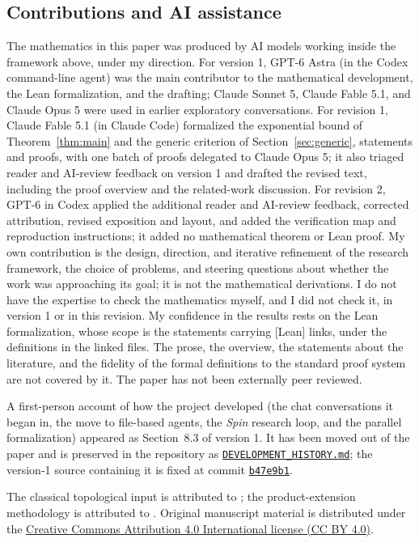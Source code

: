 \subsection{Contributions and AI assistance}\label{sec:model-assistance}
The mathematics in this paper was produced by AI models working inside the
framework above, under my direction. For version 1, GPT-6 Astra (in the
Codex command-line agent) was the main contributor to the mathematical
development, the Lean formalization, and the drafting; Claude Sonnet 5,
Claude Fable 5.1, and Claude Opus 5 were used in earlier exploratory
conversations. For revision 1, Claude Fable 5.1 (in Claude Code) formalized
the exponential bound of Theorem~\ref{thm:main} and the generic criterion of
Section~\ref{sec:generic}, statements and proofs, with one batch of proofs
delegated to Claude Opus 5; it also triaged reader and AI-review feedback on
version 1 and drafted the revised text, including the proof overview and
the related-work discussion. For revision 2, GPT-6 in Codex applied the
additional reader and AI-review feedback, corrected attribution, revised
exposition and layout, and added the verification map and reproduction
instructions; it added no mathematical theorem or Lean proof. My own contribution is the design, direction,
and iterative refinement of the research framework, the choice of problems,
and steering questions about whether the work was approaching its goal; it
is not the mathematical derivations. I do not have the expertise to check
the mathematics myself, and I did not check it, in version 1 or in this
revision. My confidence in the results rests on the Lean formalization,
whose scope is the statements carrying [Lean] links, under the definitions
in the linked files. The prose, the overview, the statements about the
literature, and the fidelity of the formal definitions to the standard
proof system are not covered by it. The paper has not been externally peer reviewed.

A first-person account of how the project developed (the chat
conversations it began in, the move to file-based agents, the
\emph{Spin} research loop, and the parallel formalization) appeared as
Section~8.3 of version 1. It has been moved out of the paper and is
preserved in the repository as
\href{https://github.com/kbr-/math-research/blob/main/publications/bit-php-resolution-over-parities/DEVELOPMENT_HISTORY.md}
{\texttt{DEVELOPMENT\_HISTORY.md}}; the version-1 source containing it is
fixed at commit
\href{https://github.com/kbr-/math-research/blob/b47e9b1ef1f5b273822001983e83d35d7acbe117/publications/bit-php-resolution-over-parities/sections/07-main-proof-framework.tex}
{\texttt{b47e9b1}}.

The classical topological input is attributed to \cite{BLVZ94};
the product-extension methodology is attributed to \cite{BIKPRS}.
Original manuscript material is distributed under the
\href{https://creativecommons.org/licenses/by/4.0/}
{Creative Commons Attribution 4.0 International license (CC BY 4.0)}.
